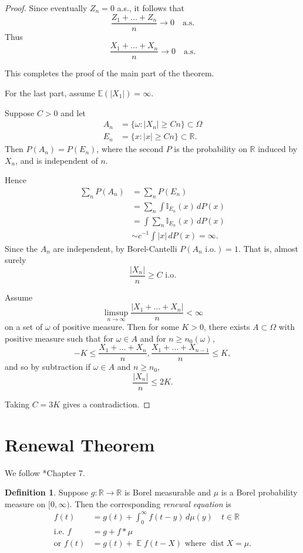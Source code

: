 \documentclass[a4paper]{amsart}
\theoremstyle{plain}
\theoremstyle{definition}
\newtheorem{definition}[theorem]{Definition}%
\theoremstyle{remark}
\DeclareMathOperator{\dist}{dist}
\DeclareMathOperator{\expected}{\mathbb{E}}
\begin{document}
\begin{proof}
Since eventually $ Z_n = 0 $ a.s., it follows that 
\[
\frac{Z_1+\dots+Z_n}{n}  \to 0 \quad \text{a.s.}
\]
Thus
\[
\frac{X_1+\dots+X_n}{n}  \to 0 \quad \text{a.s.}
\]

This completes the proof of the main part of the theorem.
 
\bigskip
For the last part, assume $ \mathbb{E} (|X_1|) = \infty $.

Suppose $ C > 0 $ and let
\begin{align*}
A_n &= \{ \omega : |X_n|\geq Cn \} \subset \Omega \\
E_n &= \{ x : |x| \geq Cn \} \subset \mathbb{R} .
\end{align*}
Then $ P(A_n) = P(E_n) $, where the second $ P $ is the probability on $ \mathbb{R} $ induced by $ X_n $, and is independent of $ n $.

Hence
\begin{align*}
\sum_n P(A_n) &= \sum_n P(E_n) \\
        &= \sum_n \int \mathbb{I}_{E_n}(x)\, dP(x) \\
        &=  \int  \sum_n\mathbb{I}_{E_n}(x)\, dP(x) \\
      &\sim c^{-1} \int |x|\, dP(x) = \infty.
      \end{align*} 
Since the $ A_n $ are independent, by Borel-Cantelli $ P(A_n \text{ i.o.}) = 1 $.  That is, almost surely 
\[
\frac{ |X_n|}{n}\geq C  \text{ i.o.}
\]

Assume 
\[
\limsup_{n\to \infty } \frac{|X_1+\dots +X_n|}{n}   < \infty
\]
on a set   of $ \omega $ of positive measure.  Then for some $ K > 0 $, there exists  $ A\subset \Omega $ with positive measure such that 
for $ \omega \in A $ and for $ n \geq n_0( \omega ) $,
\[ -K \leq \frac{X_1+\dots + X_n}{n}, \frac{X_1+\dots + X_{n-1}}{n} \leq K,
\]
and so by subtraction if $ \omega \in A $ and $ n \geq n_0 $, 
\[
\frac{|X_n|}{n} \leq 2K.
\]

Taking $ C = 3K $ gives a contradiction.
\end{proof} 

\section{Renewal Theorem}

We   follow  \cite{Fal}*{Chapter 7}.

\begin{definition} Suppose $ g: \mathbb{R}  \to \mathbb{R} $ is Borel measurable and $ \mu $ is a Borel probability measure on $ [0,\infty ) $.  Then 
the corresponding \emph{renewal equation} is
\begin{equation} \label{re}
\begin{aligned}
f(t ) &= g(t) + \int_0^\infty f(t-y)\, d\mu(y) \quad t \in \mathbb{R}  \\
\text{i.e.\ } f &= g + f *\mu\\
\text{or } f (t)  &=  g(t) + \expected f(t-X)   \text{ where } \dist X = \mu .
\end{aligned} 
\end{equation}  
\end{definition} 
\end{document}

